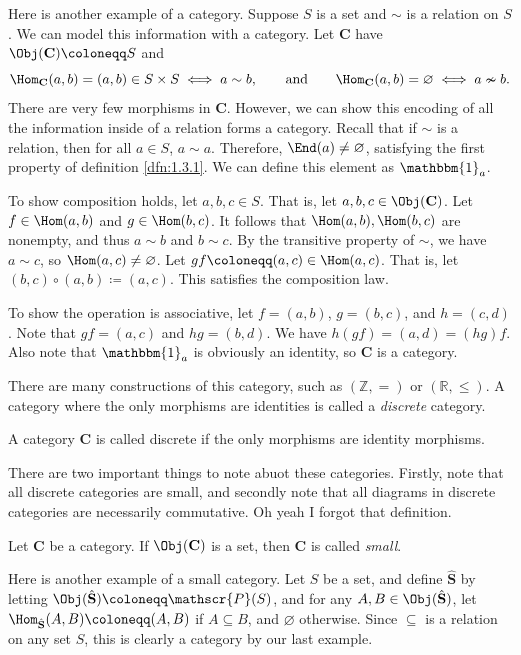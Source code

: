 Here is another example of a category. Suppose $S$ is a set and $\sim $ is a relation on $S$. We can model this information with a category. Let $\mathbf{C}$ have $\Obj( \mathbf{C} ) \coloneqq S$ and
\[
	\Hom_{\mathbf{C}}(a , b) = (a,b)\in S\times S \iff a\sim b,\qquad \text{and}\qquad \Hom_{\mathbf{C}}(a , b) =\varnothing \iff a \nsim b
.\]
There are very few morphisms in $\mathbf{C}$. However, we can show this encoding of all the information inside of a relation forms a category. Recall that if $\sim $ is a relation, then for all $a\in S$, $a\sim a$. Therefore, $\End(a) \neq \varnothing$, satisfying the first property of definition \ref{dfn:1.3.1}. We can define this element as $\mathbbm{1}_{a} $.

To show composition holds, let $a,b,c\in S$. That is, let $a,b,c\in \Obj( \mathbf{C} ) $. Let $f\in \Hom(a , b) $ and $g\in \Hom(b , c) $. It follows that $\Hom(a , b) ,\Hom(b , c) $ are nonempty, and thus $a\sim b$ and $b\sim c$. By the transitive property of $\sim $, we have $a\sim c$, so $\Hom(a , c) \neq \varnothing$. Let $gf\coloneqq (a,c)\in \Hom(a , c) $. That is, let $(b,c)\circ (a,b)\coloneqq (a,c)$. This satisfies the composition law.

To show the operation is associative, let $f=(a,b)$, $g=(b,c)$, and $h=(c,d)$. Note that $gf=(a,c)$ and $hg=(b,d)$. We have $h(gf)=(a,d)=(hg)f$. Also note that $\mathbbm{1}_{a} $ is obviously an identity, so $\mathbf{C}$ is a category.

There are many constructions of this category, such as $(\mathbb{Z},=)$ or $(\mathbb{R},\leq )$. A category where the only morphisms are identities is called a \emph{discrete} category.
\begin{definition}\label{dfn:1.3.4}
	A category $\mathbf{C}$ is called discrete if the only morphisms are identity morphisms.
\end{definition}
There are two important things to note abuot these categories. Firstly, note that all discrete categories are small, and secondly note that all diagrams in discrete categories are necessarily commutative. Oh yeah I forgot that definition.
\begin{definition}\label{dfn:1.3.5}
	Let $\mathbf{C}$ be a category. If $\Obj( \mathbf{C} ) $ is a set, then $\mathbf{C}$ is called \emph{small}.
\end{definition}

Here is another example of a small category. Let $S$ be a set, and define $\hat{\mathbf{S}}$ by letting $\Obj( \hat{\mathbf{S}} ) \coloneqq \mathscr{P} (S)$, and for any $A,B\in \Obj( \hat{\mathbf{S}} ) $, let $\Hom_{\hat{\mathbf{S}}}(A , B) \coloneqq (A,B)$ if $A\subseteq B$, and $\varnothing$ otherwise. Since $\subseteq $ is a relation on any set $S$, this is clearly a category by our last example.

